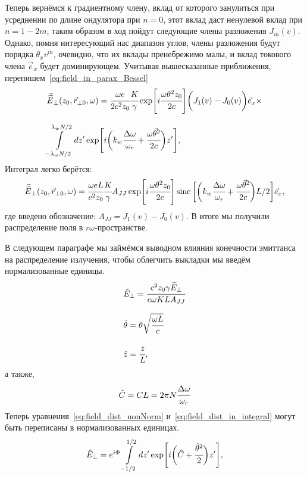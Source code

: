 Теперь вернёмся к градиентному члену, вклад от которого занулиться при усреднении по длине ондулятора при $n = 0$, этот вклад даст ненулевой вклад при $n = 1 - 2m$, таким образом в ход пойдут следующие члены разложения $J_m(v)$. Однако, помня интересующий нас диапазон углов, члены разложения будут порядка $\theta_x v^m$, очевидно, что их вклады пренебрежимо малы, и вклад токового члена $\vec{e}_x$ будет доминирующем. Учитывая вышесказанные приближения, перепишем~\ref{eq:field_in_parax_Bessel}
\begin{equation}
	\label{eq:field_dist_in_integral}
	\begin{array}{lcl}
		\vec{\widetilde{E}}_{\bot}(z_0,  \vec{r}_{\bot 0}, \omega) =
		\cfrac{\omega e}{2c^2z_0}\cfrac{K}{\gamma}\exp[i\cfrac{\omega \theta^2 z_0}{2c}]
		\bigg(J_1(v) - J_0(v)\bigg)\vec{e}_x\times\\
		\\
		\displaystyle\int\limits_{-\lambda_w N/2}^{\lambda_w N/2} dz'
		\exp[i\bigg(k_w \cfrac{\Delta\omega}{\omega_r} + 
		\cfrac{\omega\vec{\theta}^2}{2c}\bigg)z'],
	\end{array}	
\end{equation}
Интеграл легко берётся:
\begin{equation}
	\label{eq:field_dist_nonNorm}
	\begin{array}{lcl}
		\vec{\widetilde{E}}_{\bot}(z_0,  \vec{r}_{\bot 0}, \omega) =
		\cfrac{\omega eL}{c^2z_0}\cfrac{K}{\gamma}A_{JJ}\exp[i\cfrac{\omega \theta^2 z_0}{2c}]
		\operatorname{sinc} \bigg[\bigg(k_w \cfrac{\Delta\omega}{\omega_r} + 
		\cfrac{\omega\vec{\theta}^2}{2c}\bigg)L/2 \bigg ]\vec{e}_x ,
	\end{array}	
\end{equation}
где введено обозначение: $A_{JJ} = J_1(v) - J_0(v)$. В итоге мы получили распределение поля в $r\omega$-пространстве. 

В следующем параграфе мы займёмся выводном влияния конечности эмиттанса на распределение излучения, чтобы облегчить выкладки мы введём нормализованные единицы.
\begin{equation}
	\label{eq:norm_units}
	\begin{array}{lcl}
		\hat{E}_{\bot} = \cfrac{c^2z_0\gamma \widetilde{E}_{\bot}}{e\omega KLA_{JJ}}\\
		\\
		\hat{\theta} = \theta\sqrt{\cfrac{\omega L}{c}}\\
		\\
		\hat{z} = \cfrac{z}{L} ,
	\end{array}	
\end{equation}
а также, 
\begin{equation}
	\hat{C} = CL = 2\pi N\cfrac{\Delta\omega}{\omega_r}
\end{equation}
Теперь уравнения~\ref{eq:field_dist_nonNorm} и~\ref{eq:field_dist_in_integral} могут быть переписаны в нормализованных единицах.
\begin{equation}
	\label{eq:field_dist_in_integral}
	\begin{array}{lcl}
		\hat{E}_{\bot} = e^{i\Phi}
		\displaystyle\int\limits_{-1/2}^{1/2} dz'
		\exp[i\bigg(\hat{C} + 
		\cfrac{\hat{\theta}^2}{2}\bigg)z'],
	\end{array}	
\end{equation}

